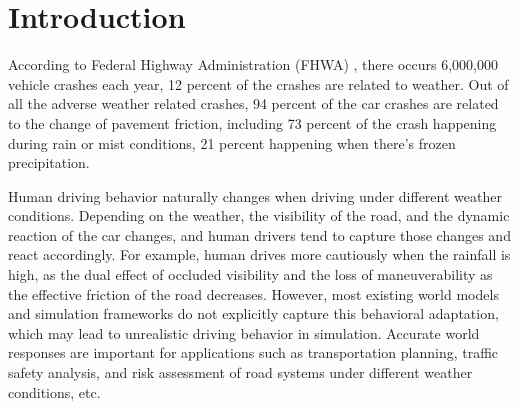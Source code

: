 \section{Introduction}
\label{sec:intro}


According to Federal Highway Administration (FHWA) \cite{noauthor_how_nodate}, there occurs 6,000,000 vehicle crashes each year, 12 percent of the crashes are related to weather. Out of all the adverse weather related crashes,  94 percent of the car crashes are related to the change of pavement friction, including 73 percent of the crash happening during rain or mist conditions, 21 percent happening when there's frozen precipitation.

Human driving behavior naturally changes when driving under different weather conditions. Depending on the weather, the visibility of the road, and the dynamic reaction of the car changes, and human drivers tend to capture those changes and react accordingly. For example, human drives more cautiously when the rainfall is high, as the dual effect of occluded visibility and the loss of maneuverability as the effective friction of the road decreases. However, most existing world models and simulation frameworks do not explicitly capture this behavioral adaptation, which may lead to unrealistic driving behavior in simulation. Accurate world responses are important for applications such as transportation planning, traffic safety analysis, and risk assessment of road systems under different weather conditions, etc. 

